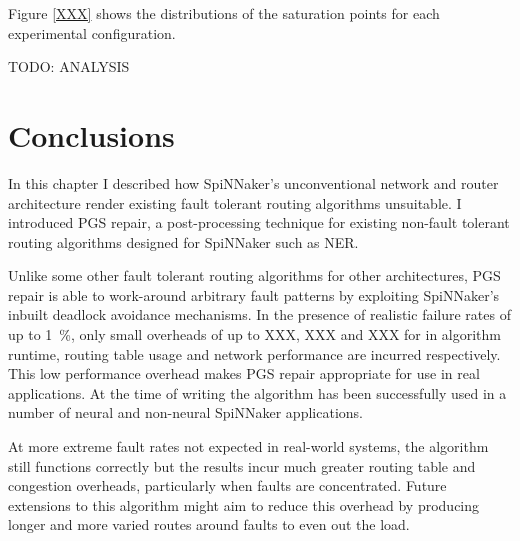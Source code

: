 			Figure \ref{XXX} shows the distributions of the saturation points for
			each experimental configuration.
			
			TODO: ANALYSIS
		
	\section{Conclusions}
		
		In this chapter I described how SpiNNaker's unconventional network and
		router architecture render existing fault tolerant routing algorithms
		unsuitable. I introduced PGS repair, a post-processing technique for
		existing non-fault tolerant routing algorithms designed for SpiNNaker such
		as NER.
		
		Unlike some other fault tolerant routing algorithms for other
		architectures, PGS repair is able to work-around arbitrary fault patterns
		by exploiting SpiNNaker's inbuilt deadlock avoidance mechanisms. In the
		presence of realistic failure rates of up to \SI{1}{\percent}, only small
		overheads of up to XXX, XXX and XXX for in algorithm runtime, routing table
		usage and network performance are incurred respectively. This low
		performance overhead makes PGS repair appropriate for use in real
		applications. At the time of writing the algorithm has been successfully
		used in a number of neural and non-neural SpiNNaker applications.
		
		At more extreme fault rates not expected in real-world systems, the
		algorithm still functions correctly but the results incur much greater
		routing table and congestion overheads, particularly when faults are
		concentrated. Future extensions to this algorithm might aim to reduce this
		overhead by producing longer and more varied routes around faults to even
		out the load.
